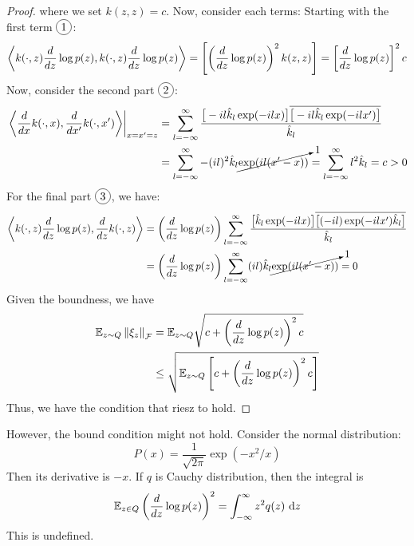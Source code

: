 \begin{proof}
    where we set $k(z,z) = c$. Now, consider each terms: Starting with the first term $\circled{1}$:
    \begin{equation*}
        \left\langle k(\cdot, z)\frac{d}{dz} \log p(z), k(\cdot, z)\frac{d}{dz} \log p(z) \right\rangle = \left[ \left( \frac{d}{dz}\log p(z) \right)^2k(z,z) \right] = \left[ \frac{d}{dz}\log p(z) \right]^2 c
    \end{equation*}
    Now, consider the second part $\circled{2}$:
    \begin{equation*}
    \begin{aligned}
        \left.\left\langle \frac{d}{dx} k(\cdot, x), \frac{d}{dx'} k(\cdot, x') \right\rangle\right|_{x=x'=z} &= \sum^\infty_{l=-\infty} \frac{ \big[-il\hat{k}_l\exp(-ilx)\big]\overline{\big[-il\hat{k}_l\exp(-ilx')\big]}}{\hat{k}_l} \\
        &= \sum^\infty_{l=-\infty}-(il)^2\hat{k}_l\cancelto{1}{\exp(il(x'-x))} = \sum^\infty_{l=-\infty}l^2\hat{k}_l = c >0 \\
    \end{aligned}
    \end{equation*}
    For the final part $\circled{3}$, we have:
    \begin{equation*}
    \begin{aligned}
        \left\langle k(\cdot, z)\frac{d}{dz} \log p(z), \frac{d}{dz} k(\cdot, z) \right\rangle &= \left( \frac{d}{dz}\log p(z) \right)\sum^\infty_{l=-\infty}\frac{\big[ \hat{k}_l\exp(-ilx) \big]\overline{\big[ (-il)\exp(-ilx')\hat{k}_l \big]}}{\hat{k}_l} \\
        &=\left( \frac{d}{dz}\log p(z) \right)\sum^\infty_{l=-\infty}(il)\hat{k}_l\cancelto{1}{\exp(il(x'-x))} = 0
    \end{aligned}
    \end{equation*}
    Given the boundness, we have 
    \begin{equation*}
    \begin{aligned}
        \mathbb{E}_{z\sim Q}\left\lVert\xi_z\right\rVert_\mathcal{F} &= \mathbb{E}_{z\sim Q}\sqrt{c + \left( \frac{d}{dz}\log p(z) \right)^2c} \\
        &\le\sqrt{\mathbb{E}_{z\sim Q}\left[ c + \left( \frac{d}{dz}\log p(z) \right)^2c \right]}
    \end{aligned}
    \end{equation*}
    Thus, we have the condition that riesz to hold.
\end{proof}

\begin{remark}
    However, the bound condition might not hold. Consider the normal distribution:
    \begin{equation*}
        P(x) = \frac{1}{\sqrt{2\pi}}\exp(-x^2/x)
    \end{equation*}
    Then its derivative is $-x$. If $q$ is Cauchy distribution, then the integral is 
    \begin{equation*}
        \mathbb{E}_{z\in Q} \left(  \frac{d}{dz} \log p(z)  \right)^2 = \int^\infty_{-\infty} z^2q(z)\ \mathrm{d} z 
    \end{equation*}
    This is undefined.
\end{remark}

